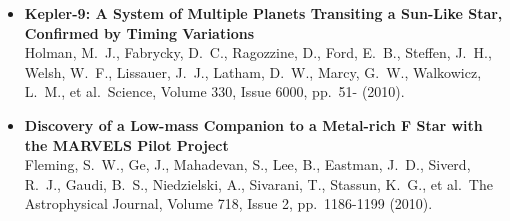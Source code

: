 \documentclass[11pt,letterpaper,sans]{moderncv} %
\begin{document}
\begin{itemize}
 \item \textbf{ Kepler-9: A System of Multiple Planets Transiting a 
Sun-Like Star, Confirmed by Timing Variations } \\ Holman, M.~J., Fabrycky, 
D.~C., Ragozzine, D., Ford, E.~B., Steffen, J.~H., Welsh, W.~F., Lissauer, 
J.~J., Latham, D.~W., Marcy, G.~W., Walkowicz, L.~M., et al.\ Science, 
Volume 330, Issue 6000, pp.~51- (2010).\ \\ 

 \item \textbf{ Discovery of a Low-mass Companion to a Metal-rich F Star 
with the MARVELS Pilot Project } \\ Fleming, S.~W., Ge, J., Mahadevan, S., 
Lee, B., Eastman, J.~D., Siverd, R.~J., Gaudi, B.~S., Niedzielski, A., 
Sivarani, T., Stassun, K.~G., et al.\ The Astrophysical Journal, Volume 
718, Issue 2, pp.~1186-1199 (2010).\ \\ 


\end{itemize}

\newpage
\end{document}
